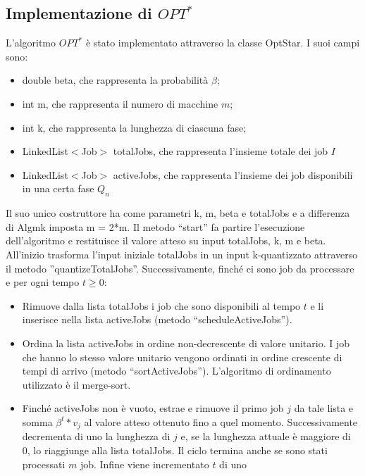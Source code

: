 \documentclass[12pt]{article}
\begin{document}
\subsection{Implementazione di $OPT^{*}$}
L’algoritmo $OPT^{*}$ è stato implementato attraverso la classe OptStar. I suoi campi sono:
\begin{itemize}
\item{double beta, che rappresenta la probabilità $\beta$;}
\item{int m, che rappresenta il numero di macchine $m$;}
\item{int k, che rappresenta la lunghezza di ciascuna fase;}
\item{LinkedList$<$Job$>$ totalJobs, che rappresenta l’insieme totale dei job $I$}
\item{LinkedList$<$Job$>$ activeJobs, che rappresenta l’insieme dei job disponibili in una certa fase $Q_{n}$}
\end{itemize}
Il suo unico costruttore ha come parametri k, m, beta e totalJobs e a differenza di Algmk imposta m = 2*m. Il metodo “start” fa partire l’esecuzione dell’algoritmo e restituisce il valore atteso su input totalJobs, k, m e beta. All'inizio trasforma l'input iniziale totalJobs in un input k-quantizzato attraverso il metodo ''quantizeTotalJobs''. Successivamente, finché ci sono job da processare e per ogni tempo $t \geq 0$:
\begin{itemize}
\item{Rimuove dalla lista totalJobs i job che sono disponibili al tempo $t$ e li inserisce nella lista activeJobs (metodo “scheduleActiveJobs”).}
\item{Ordina la lista activeJobs in ordine non-decrescente di valore unitario. I job che hanno lo stesso valore unitario  vengono ordinati in ordine crescente di tempi di arrivo (metodo “sortActiveJobs”). L’algoritmo di ordinamento utilizzato è il merge-sort.}
\item{Finché activeJobs non è vuoto, estrae e rimuove il primo job $j$ da tale lista e somma $\beta^{t} * v_{j}$ al valore atteso ottenuto fino a quel momento. Successivamente decrementa di uno la lunghezza di $j$ e, se la lunghezza attuale è maggiore di 0, lo riaggiunge alla lista totalJobs. Il ciclo termina anche se sono stati processati $m$ job. Infine viene incrementato $t$ di uno}
\end{itemize}
\end{document}
